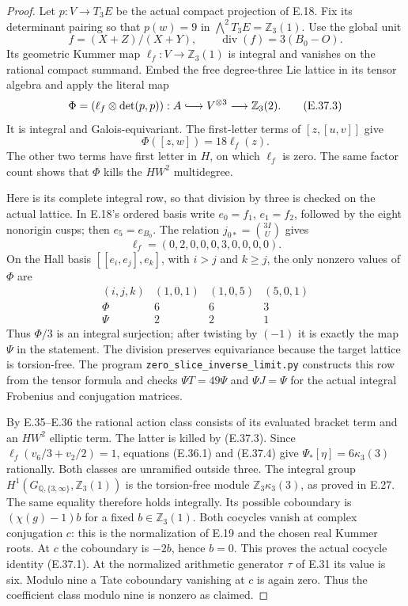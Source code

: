 \documentclass[11pt,oneside]{article}
\begin{document}
\begin{proof}
Let $p:V\to T_3E$ be the actual compact
projection of E.18. Fix its determinant
pairing so that $p(w)=9$ in
$\bigwedge^2T_3E=\mathbb Z_3(1)$.
Use the global unit
\[
                 f=(X+Z)/(X+Y),
       \qquad\operatorname{div}(f)=3(B_0-O).
\]
Its geometric Kummer map
$\ell_f:V\to\mathbb Z_3(1)$ is integral
and vanishes on the rational compact
summand. Embed the free degree-three
Lie lattice in its tensor algebra and
apply the literal map
\[
 \Phi=(\ell_f\otimes\det(p,p)):
    A\lhook\joinrel\longrightarrow V^{\otimes3}
       \longrightarrow\mathbb Z_3(2).
 \tag{E.37.3}
\]
It is integral and Galois-equivariant.
The first-letter terms of $[z,[u,v]]$
give
\[
                  \Phi([z,w])=18\ell_f(z).
 \tag{E.37.4}
\]
The other two terms have first letter in
$H$, on which $\ell_f$ is zero. The same
factor count shows that $\Phi$ kills the
$HW^2$ multidegree.

Here is its complete integral row, so
that division by three is checked on
the actual lattice. In E.18's ordered
basis write $e_0=f_1$, $e_1=f_2$,
followed by the eight nonorigin cusps;
then $e_5=e_{B_0}$. The relation
$j_{0*}=\binom{3I}{U}$ gives
\[
 \ell_f=(0,2,0,0,0,3,0,0,0,0).
\]
On the Hall basis $[[e_i,e_j],e_k]$,
with $i>j$ and $k\ge j$, the only nonzero
values of $\Phi$ are
\[
 \begin{array}{c|rrr}
 (i,j,k)&(1,0,1)&(1,0,5)&(5,0,1)\\\hline
 \Phi&6&6&3\\
 \Psi&2&2&1
 \end{array}
 \tag{E.37.5}
\]
Thus $\Phi/3$ is an integral surjection;
after twisting by $(-1)$ it is exactly
the map $\Psi$ in the statement. The
division preserves equivariance because
the target lattice is torsion-free.
The program
\texttt{zero\_slice\_inverse\_limit.py}
constructs this row from the tensor
formula and checks $\Psi T=49\Psi$ and
$\Psi J=\Psi$ for the actual integral
Frobenius and conjugation matrices.

By E.35--E.36 the rational action class
consists of its evaluated bracket term
and an $HW^2$ elliptic term. The latter
is killed by (E.37.3). Since
$\ell_f(v_6/3+v_2/2)=1$, equations
(E.36.1) and (E.37.4) give
$\Psi_*[\eta]=6\kappa_3(3)$ rationally.
Both classes are unramified outside
three. The integral group
$H^1(G_{\mathbb Q,\{3,\infty\}},\mathbb Z_3(1))$
is the torsion-free module
$\mathbb Z_3\kappa_3(3)$, as proved in
E.27. The same equality therefore holds
integrally. Its possible coboundary is
$(\chi(g)-1)b$ for a fixed $b\in\mathbb Z_3(1)$.
Both cocycles vanish at complex
conjugation $c$: this is the normalization
of E.19 and the chosen real Kummer roots.
At $c$ the coboundary is $-2b$, hence
$b=0$. This proves the actual cocycle
identity (E.37.1).
At the normalized arithmetic generator
$\tau$ of E.31 its value is six.
Modulo nine a Tate coboundary vanishing
at $c$ is again zero. Thus the coefficient
class modulo nine is nonzero as claimed.


\end{proof}
\end{document}
